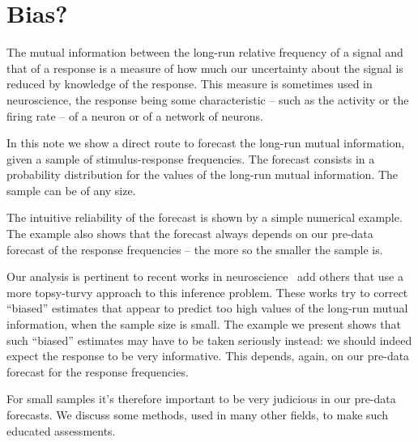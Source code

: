 \documentclass[\ifafour a4paper,12pt,\else a5paper,10pt,\fi%
onecolumn,oneside,article,%
british%
]{memoir}
\theoremstyle{remark}
\theoremstyle{innote}
\newcommand*{\citep}{\parencites}
\renewcommand*{\|}{\nonscript\,\vert\nonscript\;\mathopen{}}
\newcommand*{\puzzle}{{\fontencoding{U}\fontfamily{fontawesometwo}\selectfont\symbol{225}}}
\newcommand{\mynote}[1]{ {\color{notecolour}\puzzle\ #1}}
\begin{document}
\section{Bias?}
\label{sec:intro}

The mutual information between the long-run relative frequency of a signal
and that of a response is a measure of how much our uncertainty about the
signal is reduced by knowledge of the response. This measure is sometimes
used in neuroscience, the response being some characteristic -- such as the
activity or the firing rate -- of a neuron or of a network of neurons.

In this note we show a direct route to forecast the long-run mutual
information, given a sample of stimulus-response frequencies. The forecast
consists in a probability distribution for the values of the long-run
mutual information. The sample can be of any size.

The intuitive reliability of the forecast is shown by a simple numerical
example. The example also shows that the forecast always depends on our pre-data
forecast of the response frequencies -- the more so the smaller the sample
is.

Our analysis is pertinent to recent works in neuroscience
\citep{panzerietal2007}\mynote{add others} that use a more topsy-turvy
approach to this inference problem. These works try to correct
\enquote{biased} estimates that appear to predict too high values of the
long-run mutual information, when the sample size is small. The example we
present shows that such \enquote{biased} estimates may have to be taken
seriously instead: we should indeed expect the response to be very
informative. This depends, again, on our pre-data forecast for the response
frequencies.

For small samples it's therefore important to be very judicious in our
pre-data forecasts. We discuss some methods, used in many other fields, to
make such educated assessments.

\end{document}
